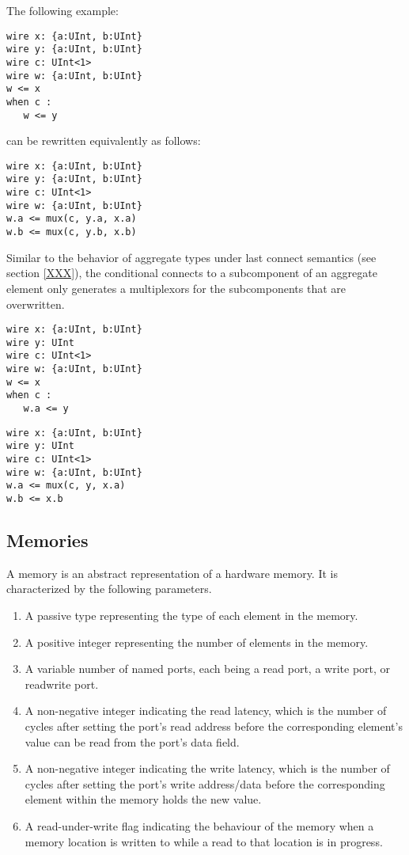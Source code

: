 \documentclass[12pt]{article}
\begin{document}
The following example:
\begin{verbatim}
wire x: {a:UInt, b:UInt}
wire y: {a:UInt, b:UInt}
wire c: UInt<1>
wire w: {a:UInt, b:UInt}
w <= x
when c :
   w <= y
\end{verbatim}
can be rewritten equivalently as follows:
\begin{verbatim}
wire x: {a:UInt, b:UInt}
wire y: {a:UInt, b:UInt}
wire c: UInt<1>
wire w: {a:UInt, b:UInt}
w.a <= mux(c, y.a, x.a)
w.b <= mux(c, y.b, x.b)
\end{verbatim}

Similar to the behavior of aggregate types under last connect semantics (see section \ref{XXX}), the conditional connects to a subcomponent of an aggregate element only generates a multiplexors for the subcomponents that are overwritten.

\begin{verbatim}
wire x: {a:UInt, b:UInt}
wire y: UInt
wire c: UInt<1>
wire w: {a:UInt, b:UInt}
w <= x
when c :
   w.a <= y
\end{verbatim}

\begin{verbatim}
wire x: {a:UInt, b:UInt}
wire y: UInt
wire c: UInt<1>
wire w: {a:UInt, b:UInt}
w.a <= mux(c, y, x.a)
w.b <= x.b
\end{verbatim}

\subsection{Memories}
A memory is an abstract representation of a hardware memory. It is characterized by the following parameters.
\begin{enumerate}
\item A passive type representing the type of each element in the memory.
\item A positive integer representing the number of elements in the memory.
\item A variable number of named ports, each being a read port, a write port, or readwrite port.
\item A non-negative integer indicating the read latency, which is the number of cycles after setting the port's read address before the corresponding element's value can be read from the port's data field.
\item A non-negative integer indicating the write latency, which is the number of cycles after setting the port's write address/data before the corresponding element within the memory holds the new value.
\item A read-under-write flag indicating the behaviour of the memory when a memory location is written to while a read to that location is in progress.
\end{enumerate}
\end{document}
